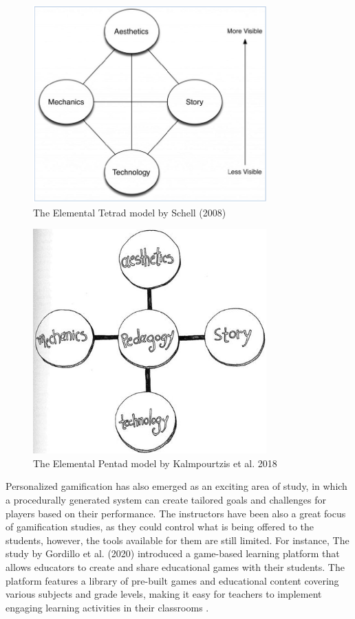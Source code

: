 \begin{figure}
    \centering
    \includegraphics[width=0.8\textwidth]{figures/Related_Work/elem_tet.png}
    \caption{The Elemental Tetrad model by Schell (2008) \cite{schell2008art}}
    \label{fig:elemental_tetrad}
\end{figure}

\begin{figure}
    \centering
    \includegraphics[width=0.8\textwidth]{figures/Related_Work/elem_pen.png}
    \caption{The Elemental Pentad model by Kalmpourtzis et al. 2018 \cite{Kalmpourtzis2018}}
    \label{fig:elemental_Pentad}
\end{figure}



Personalized gamification has also emerged as an exciting area of study, in which a procedurally generated system can create tailored goals and challenges for players based on their performance. The instructors have been also a great focus of gamification studies, as they could control what is being offered to the students, however, the tools available for them are still limited. For instance, The study by Gordillo et al. (2020) introduced a game-based learning platform that allows educators to create and share educational games with their students. The platform features a library of pre-built games and educational content covering various subjects and grade levels, making it easy for teachers to implement engaging learning activities in their classrooms \cite{sgame2020}.

